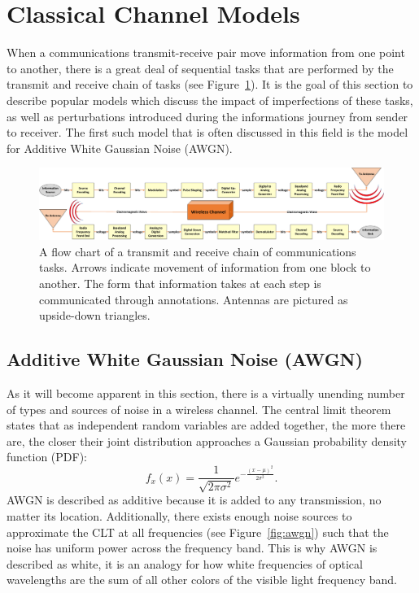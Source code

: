 \section{Classical Channel Models}
\label{chanmods}
When a communications transmit-receive pair move information from one point to another, there is a great deal of sequential tasks that are performed by the transmit and receive chain of tasks (see Figure~\ref{fig:fulltxrx}). It is the goal of this section to describe popular models which discuss the impact of imperfections of these tasks, as well as perturbations introduced during the informations journey from sender to receiver. The first such model that is often discussed in this field is the model for Additive White Gaussian Noise (AWGN).

\begin{figure}[ht!]
	\centering	\includegraphics[width=1\textwidth,keepaspectratio]{figs/txrxfull__1_.pdf}
    \caption{A flow chart of a transmit and receive chain of communications tasks. Arrows indicate movement of information from one block to another. The form that information takes at each step is communicated through annotations. Antennas are pictured as upside-down triangles.} 
\label{fig:fulltxrx}      
\end{figure}

\subsection{Additive White Gaussian Noise (AWGN)}
\label{awgn}
As it will become apparent in this section, there is a virtually unending number of types and sources of noise in a wireless channel. The central limit theorem states that as independent random variables are added together, the more there are, the closer their joint distribution approaches a Gaussian probability density function (PDF):
\begin{equation}
\label{eq:gaussianpdf}
f_x(x) = \frac{1}{\sqrt{2\pi \sigma^2}} e^{-\frac{(x-\mu)^2}{2\sigma^2}}.
\end{equation}
AWGN is described as additive because it is added to any transmission, no matter its location. Additionally, there exists enough noise sources to approximate the CLT at all frequencies (see Figure~\ref{fig:awgn}) such that the noise has uniform power across the frequency band. This is why AWGN is described as white, it is an analogy for how white frequencies of optical wavelengths are the sum of all other colors of the visible light frequency band.

